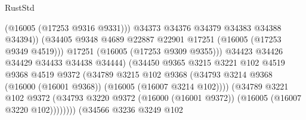 \begin{lexlean}{RustStd}
\begin{coremodule}
                                              (@16005 (@17253 @9316 @9331)))
                                            @34373
                                            @34376
                                            @34379
                                            @34383
                                            @34388
                                            @34394))
                                        (@34405
                                          @9348
                                          @4689
                                          @22887
                                          @22901
                                          @17251
                                          (@16005 (@17253 @9349 @4519)))
                                        @17251
                                        (@16005 (@17253 @9309 @9355)))
                                      @34423
                                      @34426
                                      @34429
                                      @34433
                                      @34438
                                      @34444)
                                    (@34450
                                      @9365
                                      @3215
                                      @3221
                                      @102
                                      @4519
                                      @9368
                                      @4519
                                      @9372
                                      (@34789
                                        @3215
                                        @102
                                        @9368
                                        (@34793
                                          @3214
                                          @9368
                                          (@16000 (@16001 @9368))
                                          (@16005 (@16007 @3214 @102))))
                                      (@34789
                                        @3221
                                        @102
                                        @9372
                                        (@34793
                                          @3220
                                          @9372
                                          (@16000 (@16001 @9372))
                                          (@16005 (@16007 @3220 @102))))))))
                              (@34566
                                @3236
                                @3249
                                @102

\end{coremodule}
\end{lexlean}
